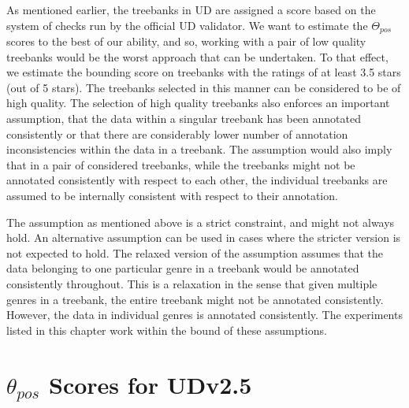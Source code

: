 As mentioned earlier, the treebanks in UD are assigned a score based on the system of checks run by the official UD validator. We want to estimate the $\Theta_{pos}$ scores to the best of our ability, and so, working with a pair of low quality treebanks would be the worst approach that can be undertaken. To that effect, we estimate the bounding score on treebanks with the ratings of at least 3.5 stars (out of 5 stars). The treebanks selected in this manner can be considered to be of high quality. The selection of high quality treebanks also enforces an important assumption, that the data within a singular treebank has been annotated consistently or that there are considerably lower number of annotation inconsistencies within the data in a treebank. The assumption would also imply that in a pair of considered treebanks, while the treebanks might not be annotated consistently with respect to each other, the individual treebanks are assumed to be internally consistent with respect to their annotation.

The assumption as mentioned above is a strict constraint, and might not always hold. An alternative assumption can be used in cases where the stricter version is not expected to hold. The relaxed version of the assumption assumes that the data belonging to one particular genre in a treebank would be annotated consistently throughout. This is a relaxation in the sense that given multiple genres in a treebank, the entire treebank might not be annotated consistently. However, the data in individual genres is annotated consistently. The experiments listed in this chapter work within the bound of these assumptions. 

\section{\texorpdfstring{$\theta_{pos}$}{theta\_pos} Scores for UDv2.5}
\label{sec:pos-harmony-scores}

